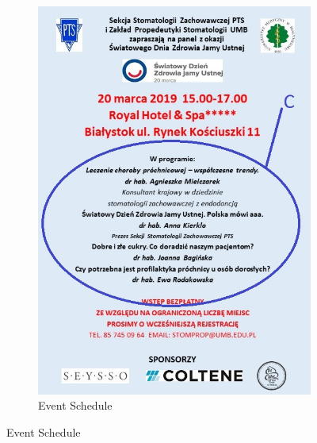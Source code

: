 \documentclass[a4paper,11pt,oneside]{scrreprt}
\begin{document}
\begin{figure}[H]
\begin{subfigure}{.5\textwidth}
		\includegraphics[clip, trim=0cm 0cm 0cm 0cm, scale=0.50]{./images/proximity.jpg}
		\caption{Event Schedule}
	\end{subfigure}
\end{figure}
\end{document}
